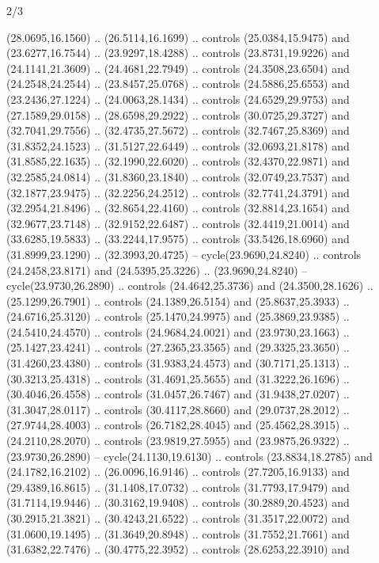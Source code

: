 \begin{flagdescription}{2/3}
\begin{scope}[yshift=\flagwidth,scale=\flagwidth/1241.93737]
\begin{scope}[y=-1mm, x=1mm,draw=gold,fill=blue,line join=miter,miter limit=4,line width=1.8\lw]
\begin{scope}[y=1mm, x=1mm, yscale=-1,shift={(573.68mm+\str,145.75)}]
\begin{scope}[scale=1.35,shift={(-9,-3)}]
\begin{scope}[scale=0.55]
\begin{scope}[scale=1.333]
    (28.0695,16.1560) .. (26.5114,16.1699) .. controls (25.0384,15.9475) and
    (23.6277,16.7544) .. (23.9297,18.4288) .. controls (23.8731,19.9226) and
    (24.1141,21.3609) .. (24.4681,22.7949) .. controls (24.3508,23.6504) and
    (24.2548,24.2544) .. (23.8457,25.0768) .. controls (24.5886,25.6553) and
    (23.2436,27.1224) .. (24.0063,28.1434) .. controls (24.6529,29.9753) and
    (27.1589,29.0158) .. (28.6598,29.2922) .. controls (30.0725,29.3727) and
    (32.7041,29.7556) .. (32.4735,27.5672) .. controls (32.7467,25.8369) and
    (31.8352,24.1523) .. (31.5127,22.6449) .. controls (32.0693,21.8178) and
    (31.8585,22.1635) .. (32.1990,22.6020) .. controls (32.4370,22.9871) and
    (32.2585,24.0814) .. (31.8360,23.1840) .. controls (32.0749,23.7537) and
    (32.1877,23.9475) .. (32.2256,24.2512) .. controls (32.7741,24.3791) and
    (32.2954,21.8496) .. (32.8654,22.4160) .. controls (32.8814,23.1654) and
    (32.9677,23.7148) .. (32.9152,22.6487) .. controls (32.4419,21.0014) and
    (33.6285,19.5833) .. (33.2244,17.9575) .. controls (33.5426,18.6960) and
    (31.8999,23.1290) .. (32.3993,20.4725) -- cycle(23.9690,24.8240) .. controls
    (24.2458,23.8171) and (24.5395,25.3226) .. (23.9690,24.8240) --
    cycle(23.9730,26.2890) .. controls (24.4642,25.3736) and (24.3500,28.1626) ..
    (25.1299,26.7901) .. controls (24.1389,26.5154) and (25.8637,25.3933) ..
    (24.6716,25.3120) .. controls (25.1470,24.9975) and (25.3869,23.9385) ..
    (24.5410,24.4570) .. controls (24.9684,24.0021) and (23.9730,23.1663) ..
    (25.1427,23.4241) .. controls (27.2365,23.3565) and (29.3325,23.3650) ..
    (31.4260,23.4380) .. controls (31.9383,24.4573) and (30.7171,25.1313) ..
    (30.3213,25.4318) .. controls (31.4691,25.5655) and (31.3222,26.1696) ..
    (30.4046,26.4558) .. controls (31.0457,26.7467) and (31.9438,27.0207) ..
    (31.3047,28.0117) .. controls (30.4117,28.8660) and (29.0737,28.2012) ..
    (27.9744,28.4003) .. controls (26.7182,28.4045) and (25.4562,28.3915) ..
    (24.2110,28.2070) .. controls (23.9819,27.5955) and (23.9875,26.9322) ..
    (23.9730,26.2890) -- cycle(24.1130,19.6130) .. controls (23.8834,18.2785) and
    (24.1782,16.2102) .. (26.0096,16.9146) .. controls (27.7205,16.9133) and
    (29.4389,16.8615) .. (31.1408,17.0732) .. controls (31.7793,17.9479) and
    (31.7114,19.9446) .. (30.3162,19.9408) .. controls (30.2889,20.4523) and
    (30.2915,21.3821) .. (30.4243,21.6522) .. controls (31.3517,22.0072) and
    (31.0600,19.1495) .. (31.3649,20.8948) .. controls (31.7552,21.7661) and
    (31.6382,22.7476) .. (30.4775,22.3952) .. controls (28.6253,22.3910) and

\end{scope}
\end{scope}
\end{scope}
\end{scope}
\end{scope}
\end{scope}
\end{flagdescription}
